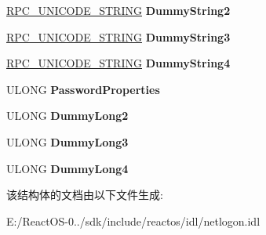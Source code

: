 \begin{DoxyCompactItemize}
\item 
\mbox{\label{struct___n_e_t_l_o_g_o_n___d_e_l_t_a___d_o_m_a_i_n_a41f806d9fefadd1d409d8f06b94ad482}} 
\hyperlink{struct___r_p_c___u_n_i_c_o_d_e___s_t_r_i_n_g}{R\+P\+C\+\_\+\+U\+N\+I\+C\+O\+D\+E\+\_\+\+S\+T\+R\+I\+NG} {\bfseries Dummy\+String2}
\item 
\mbox{\label{struct___n_e_t_l_o_g_o_n___d_e_l_t_a___d_o_m_a_i_n_a6d5abba0c8d07e594b5feb050bb2a5db}} 
\hyperlink{struct___r_p_c___u_n_i_c_o_d_e___s_t_r_i_n_g}{R\+P\+C\+\_\+\+U\+N\+I\+C\+O\+D\+E\+\_\+\+S\+T\+R\+I\+NG} {\bfseries Dummy\+String3}
\item 
\mbox{\label{struct___n_e_t_l_o_g_o_n___d_e_l_t_a___d_o_m_a_i_n_ad67e46f75520ee8d8ee0eb31996d734e}} 
\hyperlink{struct___r_p_c___u_n_i_c_o_d_e___s_t_r_i_n_g}{R\+P\+C\+\_\+\+U\+N\+I\+C\+O\+D\+E\+\_\+\+S\+T\+R\+I\+NG} {\bfseries Dummy\+String4}
\item 
\mbox{\label{struct___n_e_t_l_o_g_o_n___d_e_l_t_a___d_o_m_a_i_n_a94bc7bbc7bb43ebb8a87468460a78c31}} 
U\+L\+O\+NG {\bfseries Password\+Properties}
\item 
\mbox{\label{struct___n_e_t_l_o_g_o_n___d_e_l_t_a___d_o_m_a_i_n_a6daf343df96e8ad8c1d5bc31f5110f0a}} 
U\+L\+O\+NG {\bfseries Dummy\+Long2}
\item 
\mbox{\label{struct___n_e_t_l_o_g_o_n___d_e_l_t_a___d_o_m_a_i_n_a5bedef7535d50cb799870237fb7c4635}} 
U\+L\+O\+NG {\bfseries Dummy\+Long3}
\item 
\mbox{\label{struct___n_e_t_l_o_g_o_n___d_e_l_t_a___d_o_m_a_i_n_a91313d3c841ce39dbea5f3aa91b32361}} 
U\+L\+O\+NG {\bfseries Dummy\+Long4}
\end{DoxyCompactItemize}


该结构体的文档由以下文件生成\+:\begin{DoxyCompactItemize}
\item 
E\+:/\+React\+O\+S-\/0../sdk/include/reactos/idl/netlogon.\+idl\end{DoxyCompactItemize}
